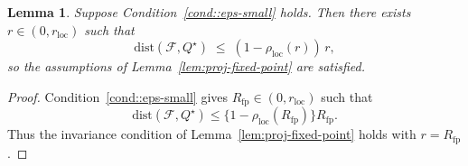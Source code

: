 \documentclass{article}
\theoremstyle{plain}
\newtheorem{lemma}{Lemma}
\theoremstyle{definition}
\theoremstyle{remark}
\begin{document}
\begin{lemma}
\label{lem:C1-implies-invariance}
Suppose Condition~\ref{cond::eps-small} holds. Then there exists
$r \in (0,r_{\mathrm{loc}})$ such that
\[
\mathrm{dist}(\mathcal F, Q^\star)
\;\le\;
(1-\rho_{\mathrm{loc}}(r))\,r,
\]
so the assumptions of Lemma~\ref{lem:proj-fixed-point} are satisfied.
\end{lemma}

\begin{proof}
Condition~\ref{cond::eps-small} gives
\(R_{\mathrm{fp}}\in(0,r_{\mathrm{loc}})\) such that
\[
\mathrm{dist}(\mathcal F,Q^\star)
\le
\{1-\rho_{\mathrm{loc}}(R_{\mathrm{fp}})\}R_{\mathrm{fp}}.
\]
Thus the invariance condition of Lemma~\ref{lem:proj-fixed-point} holds with
\(r=R_{\mathrm{fp}}\).
\end{proof}
\end{document}
